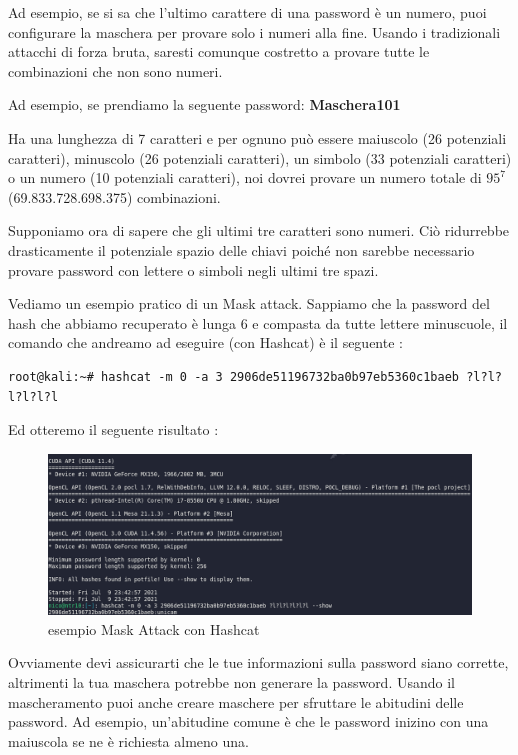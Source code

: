 Ad esempio, se si sa che l'ultimo carattere di una password è un numero, puoi configurare la maschera per provare solo i numeri alla fine. Usando i tradizionali attacchi di forza bruta, saresti comunque costretto a provare tutte le combinazioni che non sono numeri.

Ad esempio, se prendiamo la seguente password: \textbf{Maschera101}

Ha una lunghezza di 7 caratteri e per ognuno può essere maiuscolo (26 potenziali caratteri), minuscolo (26 potenziali caratteri), un simbolo (33 potenziali caratteri) o un numero (10 potenziali caratteri), noi dovrei provare un numero totale di \({95}^{7}\) (69.833.728.698.375) combinazioni.

Supponiamo ora di sapere che gli ultimi tre caratteri sono numeri. Ciò ridurrebbe drasticamente il potenziale spazio delle chiavi poiché non sarebbe necessario provare password con lettere o simboli negli ultimi tre spazi.

Vediamo un esempio pratico di un Mask attack. Sappiamo che la password del hash che abbiamo recuperato è lunga 6 e compasta da tutte lettere minuscuole, il comando che andreamo ad eseguire (con Hashcat) è il seguente :

\begin{lstlisting}[caption={Esempio rule attack wordlist}, style=javaScriptCode]
    root@kali:~# hashcat -m 0 -a 3 2906de51196732ba0b97eb5360c1baeb ?l?l?l?l?l?l
    \end{lstlisting}

Ed otteremo il seguente risultato :

\begin{figure}[h!]
    \centering
    \includegraphics[width=\linewidth]{Immagini/1/mask.png}
    \caption{esempio Mask Attack con Hashcat}
\end{figure}

Ovviamente devi assicurarti che le tue informazioni sulla password siano corrette, altrimenti la tua maschera potrebbe non generare la password. Usando il mascheramento puoi anche creare maschere per sfruttare le abitudini delle password. Ad esempio, un'abitudine comune è che le password inizino con una maiuscola se ne è richiesta almeno una.

